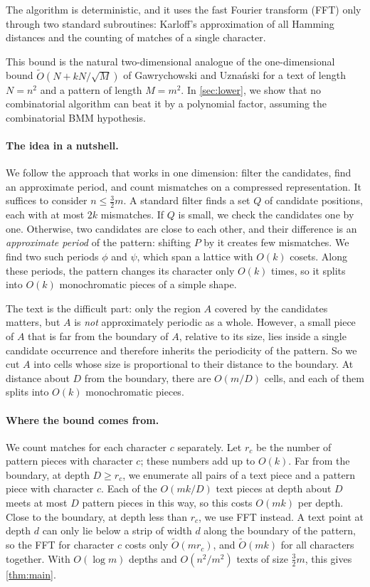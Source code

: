 \documentclass[11pt]{article}
\theoremstyle{definition}
\newcommand{\tO}{\tilde{O}}
\renewcommand{\O}{O}
\begin{document}
The algorithm is deterministic, and it uses the fast Fourier transform (FFT) only through two standard subroutines: Karloff's approximation of all Hamming distances and the counting of matches of a single character.

This bound is the natural two-dimensional analogue of the one-dimensional bound $\tO(N + kN/\sqrt{M})$ of Gawrychowski and Uzna\'nski for a text of length $N = n^2$ and a pattern of length $M = m^2$.
In \autoref{sec:lower}, we show that no combinatorial algorithm can beat it by a polynomial factor, assuming the combinatorial BMM hypothesis.

\paragraph{The idea in a nutshell.}
We follow the approach that works in one dimension: filter the candidates, find an approximate period, and count mismatches on a compressed representation.
It suffices to consider $n \le \frac32 m$.
A standard filter finds a set $Q$ of candidate positions, each with at most $2k$ mismatches.
If $Q$ is small, we check the candidates one by one.
Otherwise, two candidates are close to each other, and their difference is an \emph{approximate period} of the pattern: shifting $P$ by it creates few mismatches.
We find two such periods $\phi$ and $\psi$, which span a lattice with $\O(k)$ cosets.
Along these periods, the pattern changes its character only $\O(k)$ times, so it splits into $\O(k)$ monochromatic pieces of a simple shape.

The text is the difficult part: only the region $A$ covered by the candidates matters, but $A$ is \emph{not} approximately periodic as a whole.
However, a small piece of $A$ that is far from the boundary of $A$, relative to its size, lies inside a single candidate occurrence and therefore inherits the periodicity of the pattern.
So we cut $A$ into cells whose size is proportional to their distance to the boundary.
At distance about $D$ from the boundary, there are $\O(m/D)$ cells, and each of them splits into $\O(k)$ monochromatic pieces.

\paragraph{Where the bound comes from.}
We count matches for each character $c$ separately.
Let $r_c$ be the number of pattern pieces with character $c$; these numbers add up to $\O(k)$.
Far from the boundary, at depth $D \ge r_c$, we enumerate all pairs of a text piece and a pattern piece with character $c$.
Each of the $\O(mk/D)$ text pieces at depth about $D$ meets at most $D$ pattern pieces in this way, so this costs $\O(mk)$ per depth.
Close to the boundary, at depth less than $r_c$, we use FFT instead.
A text point at depth $d$ can only lie below a strip of width $d$ along the boundary of the pattern, so the FFT for character $c$ costs only $\tO(mr_c)$, and $\tO(mk)$ for all characters together.
With $\O(\log m)$ depths and $\O(n^2/m^2)$ texts of size $\frac32 m$, this gives \autoref{thm:main}.
\end{document}
